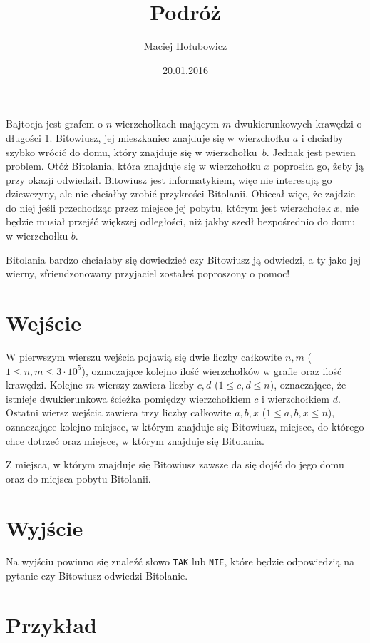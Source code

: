 \documentclass[zad,zawodnik,utf8]{sinol}
\title{Podróż}
\author{Maciej Hołubowicz} %
\date{20.01.2016}
\begin{document}
\begin{tasktext}%
Bajtocja jest grafem o $n$ wierzchołkach mającym $m$ dwukierunkowych krawędzi o długości 1.
Bitowiusz, jej mieszkaniec znajduje się w wierzchołku $a$ i chciałby szybko wrócić do domu, który znajduje się w wierzchołku~$b$. Jednak jest pewien problem. Otóż Bitolania, która znajduje się w wierzchołku $x$ poprosiła go, żeby ją przy okazji odwiedził. Bitowiusz jest informatykiem, więc nie interesują go dziewczyny, ale nie chciałby zrobić przykrości Bitolanii. Obiecał więc, że zajdzie do niej jeśli przechodząc przez miejsce jej pobytu, którym jest wierzchołek $x$, nie będzie musiał przejść większej odległości, niż jakby szedł bezpośrednio do domu w wierzchołku $b$.

Bitolania bardzo chciałaby się dowiedzieć czy Bitowiusz ją odwiedzi, a ty jako jej wierny, zfriendzonowany przyjaciel zostałeś poproszony o pomoc!

  \section{Wejście}
W pierwszym wierszu wejścia pojawią się dwie liczby całkowite $n, m$ ($1 \leq n, m \leq 3 \cdot 10^5$), oznaczające kolejno ilość wierzchołków w grafie oraz ilość krawędzi.
Kolejne $m$ wierszy zawiera liczby $c, d$ ($1 \leq c, d \leq n$), oznaczające, że istnieje dwukierunkowa ścieżka pomiędzy wierzchołkiem $c$ i wierzchołkiem $d$.
Ostatni wiersz wejścia zawiera trzy liczby całkowite $a, b, x$ ($1 \leq a, b, x \leq n$), oznaczające kolejno miejsce, w którym znajduje się Bitowiusz, miejsce, do którego chce dotrzeć oraz miejsce, w którym znajduje się Bitolania.

Z miejsca, w którym znajduje się Bitowiusz zawsze da się dojść do jego domu oraz do miejsca pobytu Bitolanii.

  \section{Wyjście}
Na wyjściu powinno się znaleźć słowo \texttt{TAK} lub \texttt{NIE}, które będzie odpowiedzią na pytanie czy Bitowiusz odwiedzi Bitolanie.

  \section{Przykład}



\end{tasktext}
\end{document}
